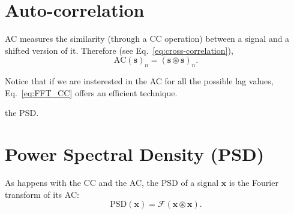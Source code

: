 
\section{Auto-correlation}
\label{sec:auto-correlation}

\gls{AC} measures the similarity (through a \gls{CC} operation)
between a signal and a shifted version of it. Therefore (see
Eq.~\ref{eq:cross-correlation}),
\begin{equation}
  \text{AC}(\mathbf{s})_n = (\mathbf{s}\circledast\mathbf{s})_n.
\end{equation}

Notice that if we are insterested in the \gls{AC} for all the possible
lag values, Eq.~\ref{eq:FFT_CC} offers an efficient technique.



the \gls{PSD}.


\section{Power Spectral Density (PSD)}
\label{sec:PSD}

As happens with the \gls{CC} and the \gls{AC}, the \gls{PSD} of a
signal $\mathbf{x}$ is the Fourier transform of its \gls{AC}:
\begin{equation}
  \text{PSD}(\mathbf{x}) = \mathcal{F}(\mathbf{x}\circledast\mathbf{x}).
\end{equation}

